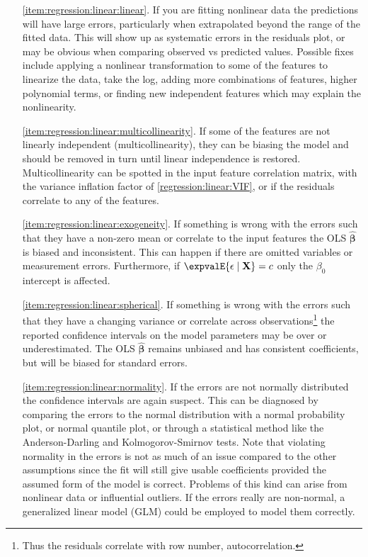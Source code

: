 \begin{itemize}[noitemsep]
  \item[\cref{item:regression:linear:linear}.] If you are fitting nonlinear data the predictions will have large errors,
particularly when extrapolated beyond the range of the fitted data.
This will show up as systematic errors in the residuals plot,
or may be obvious when comparing observed vs predicted values.
Possible fixes include applying a nonlinear transformation to some of the features to linearize the data, \eg take the log,
adding more combinations of features, \eg higher polynomial terms,
or finding new independent features which may explain the nonlinearity.

  \item[\cref{item:regression:linear:multicollinearity}.] If some of the features are not linearly independent (multicollinearity),
they can be biasing the model and should be removed in turn until linear independence is restored.
Multicollinearity can be spotted in the input feature correlation matrix,
with the variance inflation factor of \cref{regression:linear:VIF},
or if the residuals correlate to any of the features.

  \item[\cref{item:regression:linear:exogeneity}.] If something is wrong with the errors
such that they have a non-zero mean or correlate to the input features
the OLS $\hat{\bm{\beta}}$ is biased and inconsistent.
This can happen if there are omitted variables or measurement errors.
Furthermore, if $\expvalE{\epsilon \mid \mathbf{X}} = c$ only the $\beta_{0}$ intercept is affected.

  \item[\cref{item:regression:linear:spherical}.] If something is wrong with the errors
such that they have a changing variance or correlate across observations\footnote{Thus the residuals correlate with row number, \ie autocorrelation.}
the reported confidence intervals on the model parameters may be over or underestimated.
The OLS $\hat{\bm{\beta}}$ remains unbiased and has consistent coefficients, but will be biased for standard errors.

  \item[\cref{item:regression:linear:normality}.] If the errors are not normally distributed the confidence intervals are again suspect.
This can be diagnosed by comparing the errors to the normal distribution with a normal probability plot, or normal quantile plot,
or through a statistical method like the Anderson-Darling and Kolmogorov-Smirnov tests.
Note that violating normality in the errors is not as much of an issue compared to the other assumptions
since the fit will still give usable coefficients provided the assumed form of the model is correct.
Problems of this kind can arise from nonlinear data or influential outliers.
If the errors really are non-normal, a generalized linear model (GLM) could be employed to model them correctly.
\end{itemize}

